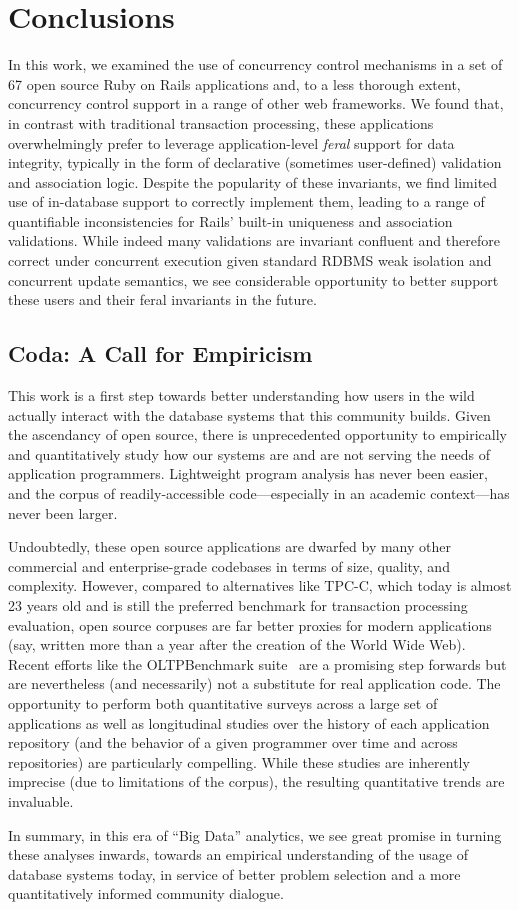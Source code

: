 
\section{Conclusions}
\label{sec:conclusion}

In this work, we examined the use of concurrency control mechanisms in
a set of 67 open source Ruby on Rails applications and, to a less
thorough extent, concurrency control support in a range of other web
frameworks. We found that, in contrast with traditional transaction
processing, these applications overwhelmingly prefer to leverage
application-level \textit{feral} support for data integrity, typically
in the form of declarative (sometimes user-defined) validation and
association logic. Despite the popularity of these invariants, we find
limited use of in-database support to correctly implement them,
leading to a range of quantifiable inconsistencies for Rails' built-in
uniqueness and association validations. While indeed many validations
are invariant confluent and therefore correct under concurrent
execution given standard RDBMS weak isolation and concurrent update
semantics, we see considerable opportunity to better support these
users and their feral invariants in the future.


\subsection*{Coda: A Call for Empiricism}

This work is a first step towards better understanding how users in
the wild actually interact with the database systems that this
community builds. Given the ascendancy of open source, there is
unprecedented opportunity to empirically and quantitatively study how
our systems are and are not serving the needs of application
programmers. Lightweight program analysis has never been easier, and
the corpus of readily-accessible code---especially in an academic
context---has never been larger.

Undoubtedly, these open source applications are dwarfed by many other
commercial and enterprise-grade codebases in terms of size, quality,
and complexity. However, compared to alternatives like TPC-C, which
today is almost 23 years old and is still the preferred benchmark for
transaction processing evaluation, open source corpuses are far better
proxies for modern applications (say, written more than a year after
the creation of the World Wide Web). Recent efforts like the
OLTPBenchmark suite~\cite{oltpbench} are a promising step forwards but
are nevertheless (and necessarily) not a substitute for real
application code. The opportunity to perform both quantitative surveys
across a large set of applications as well as longitudinal studies
over the history of each application repository (and the behavior of a
given programmer over time and across repositories) are particularly
compelling. While these studies are inherently imprecise (due to
limitations of the corpus), the resulting quantitative trends are
invaluable.

In summary, in this era of ``Big Data'' analytics, we see great
promise in turning these analyses inwards, towards an empirical
understanding of the usage of database systems today, in service of
better problem selection and a more quantitatively informed community
dialogue.

